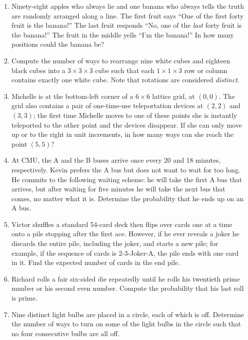 \documentclass[10pt]{article}
\begin{document}
\begin{enumerate}

\item Ninety-eight apples who always lie and one banana who always tells the truth are randomly arranged along a line. The first fruit says ``One of the first forty fruit is the banana!'' The last fruit responds ``No, one of the \emph{last} forty fruit is the banana!'' The fruit in the middle yells ``I'm the banana!'' In how many positions could the banana be?

\item Compute the number of ways to rearrange nine white cubes and eighteen black cubes into a $3\times 3\times 3$ cube such that each $1\times1\times3$ row or column contains exactly one white cube. Note that rotations are considered \textit{distinct}.

\item Michelle is at the bottom-left corner of a $6\times 6$ lattice grid, at $(0,0)$. The grid also contains a pair of one-time-use teleportation devices at $(2,2)$ and $(3,3)$; the first time Michelle moves to one of these points she is instantly teleported to the other point and the devices disappear. If she can only move up or to the right in unit increments, in how many ways can she reach the point $(5,5)$?

\item At CMU, the A and the B buses arrive once every 20 and 18 minutes, respectively. Kevin prefers the A bus but does not want to wait for too long.  He commits to the following waiting scheme: he will take the first A bus that arrives, but after waiting for five minutes he will take the next bus that comes, no matter what it is. Determine the probability that he ends up on an A bus.

\item Victor shuffles a standard 54-card deck then flips over cards one at a time onto a pile stopping after the first ace. However, if he ever reveals a joker he discards the entire pile, including the joker, and starts a new pile; for example, if the sequence of cards is 2-3-Joker-A, the pile ends with one card in it. Find the expected number of cards in the end pile.

\item Richard rolls a fair six-sided die repeatedly until he rolls his twentieth prime number or his second even number. Compute the probability that his last roll is prime.

\item Nine distinct light bulbs are placed in a circle, each of which is off. Determine the number of ways to turn on some of the light bulbs in the circle such that no four consecutive bulbs are all off. %


\end{enumerate}
\end{document}
